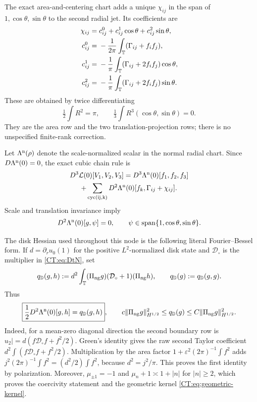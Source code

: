 \documentclass[11pt]{amsart}
\numberwithin{equation}{section}
\theoremstyle{definition}
\theoremstyle{remark}
\newcommand{\T}{\mathbb T}
\newcommand{\PiNG}{\Pi_{\rm ng}}
\newcommand{\qD}{q_{\mathbb D}}
\begin{document}
The exact area-and-centering chart adds a unique $\chi_{ij}$ in the span
of $1,\cos\theta,\sin\theta$ to the second radial jet.  Its coefficients
are
\begin{align}
 \chi_{ij}={}&c_{ij}^0+c_{ij}^1\cos\theta+c_{ij}^2\sin\theta,
 \label{CT:eq:chi}\\
 c_{ij}^0={}&-\frac1{2\pi}\int_\T
    (\Gamma_{ij}+f_if_j),\notag\\
 c_{ij}^1={}&-\frac1\pi\int_\T
    (\Gamma_{ij}+2f_if_j)\cos\theta,\notag\\
 c_{ij}^2={}&-\frac1\pi\int_\T
    (\Gamma_{ij}+2f_if_j)\sin\theta.\notag
\end{align}
These are obtained by twice differentiating
\[
 \tfrac12\int R^2=\pi,
 \qquad \tfrac13\int R^3(\cos\theta,\sin\theta)=0.
\]
They are the area row and the two translation-projection rows; there is no
unspecified finite-rank correction.

Let $\Lambda^{\rm n}(\rho)$ denote the scale-normalized scalar in the
normal radial chart.  Since $D\Lambda^{\rm n}(0)=0$, the exact cubic chain
rule is
\begin{multline}\label{CT:eq:physical-chain}
 D^3\mathcal L(0)[V_1,V_2,V_3]
 =D^3\Lambda^{\rm n}(0)[f_1,f_2,f_3]\\
 +\sum_{\rm cyc(ij,k)}D^2\Lambda^{\rm n}(0)
 [f_k,\Gamma_{ij}+\chi_{ij}].
\end{multline}
Scale and translation invariance imply
\begin{equation}\label{CT:eq:geometric-kernel}
 D^2\Lambda^{\rm n}(0)[g,\psi]=0,
 \qquad \psi\in\operatorname {span}\{1,\cos\theta,\sin\theta\}.
\end{equation}

The disk Hessian used throughout this node is the following literal
Fourier--Bessel form.  If
$d=\partial_ru_0(1)$ for the positive $L^2$-normalized disk state and
$\mathcal D_\circ$ is the multiplier in \eqref{CT:eq:DtN}, set
\begin{equation}\label{CT:eq:qD-definition}
 \qD(g,h):=d^2\int_\T
  (\PiNG g)(\mathcal D_\circ+1)(\PiNG h),
 \qquad \qD(g):=\qD(g,g).
\end{equation}
Thus
\begin{equation}\label{CT:eq:disk-Hessian}
 \boxed{\frac12D^2\Lambda^{\rm n}(0)[g,h]=\qD(g,h)},
 \qquad
 c\|\PiNG g\|_{H^{1/2}}^2
 \le \qD(g)\le
 C\|\PiNG g\|_{H^{1/2}}^2.
\end{equation}
Indeed, for a mean-zero diagonal direction the second boundary row is
$u_2|=d(f\mathcal D_\circ f+f^2/2)$.  Green's identity gives the raw
second Taylor coefficient
$d^2\int(f\mathcal D_\circ f+f^2/2)$.  Multiplication by the area factor
$1+\varepsilon^2(2\pi)^{-1}\int f^2$ adds
$j^2(2\pi)^{-1}\int f^2=(d^2/2)\int f^2$, because
$d^2=j^2/\pi$.  This proves the first identity by polarization.
Moreover, $\mu_{\pm1}=-1$ and
$\mu_n+1\asymp1+|n|$ for $|n|\ge2$, which proves the coercivity statement
and the geometric kernel \eqref{CT:eq:geometric-kernel}.
\end{document}
